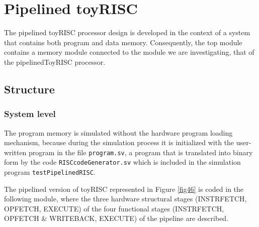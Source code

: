 \newpage

\section{Pipelined toyRISC}\label{sec:pipelined_toyrisc}

The pipelined toyRISC processor design is developed in the context of a system that contains both program and data memory. Consequently, the top module contains a memory module connected to the module we are investigating, that of the pipelinedToyRISC processor.

\subsection{Structure}

\subsubsection{System level}


The program memory is simulated without the hardware program loading mechanism, because during the simulation process it is initialized with the user-written program in the file {\tt program.sv}, a program that is translated into binary form by the code {\tt RISCcodeGenerator.sv} which is included in the simulation program {\tt testPipelinedRISC}.


The pipelined version of toyRISC represented in Figure \ref{fig46} is coded in the following module, where the three hardware structural stages (INSTRFETCH, OPFETCH, EXECUTE) of the four functional stages (INSTRFETCH, OPFETCH \& WRITEBACK, EXECUTE) of the pipeline are described. 


